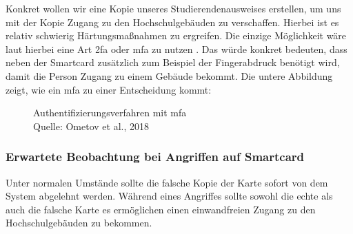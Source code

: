 Konkret wollen wir eine Kopie unseres Studierendenausweises erstellen, um uns mit der Kopie Zugang zu den Hochschulgebäuden 
zu verschaffen. Hierbei ist es relativ schwierig Härtungsmaßnahmen zu ergreifen. Die einzige Möglichkeit wäre laut 
 hierbei eine Art \acrshort{2fa} oder \acrshort{mfa} zu nutzen \cite{refst:2fa}. Das würde konkret bedeuten, dass
neben der Smartcard zusätzlich zum Beispiel der Fingerabdruck benötigt wird, damit die Person Zugang zu einem Gebäude bekommt. Die untere
Abbildung zeigt, wie ein \acrshort{mfa} zu einer Entscheidung kommt:


\begin{figure}[H]
  \caption{Authentifizierungsverfahren mit \acrshort{mfa} \\ Quelle: Ometov et al., 2018}
  \label{fig:refart_AOMF}
\end{figure}


\subsubsection{Erwartete Beobachtung bei Angriffen auf Smartcard}
Unter normalen Umstände sollte die falsche Kopie der Karte sofort von dem System abgelehnt werden. Während eines Angriffes
sollte sowohl die echte als auch die falsche Karte es ermöglichen einen einwandfreien Zugang zu den Hochschulgebäuden zu bekommen.

